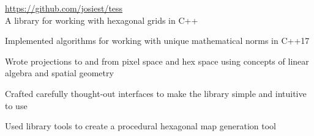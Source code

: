 \documentclass[10pt]{article}
\newenvironment{itemize*}
{\begin{itemize}[leftmargin=*]
    \setlength{\parskip}{0.5pt}}
{\end{itemize}}
\begin{document}
\begin{description}[leftmargin=!,labelwidth=\widthof{\bfseries tess}]
\item[tess] \url{https://github.com/josiest/tess}\\
    A library for working with hexagonal grids in C++
\end{description}
\begin{itemize*}
\item Implemented algorithms for working with unique mathematical norms in C++17
\item Wrote projections to and from pixel space and hex space using concepts of
      linear algebra and spatial geometry
\item Crafted carefully thought-out interfaces to make the library simple and
      intuitive to use
\item Used library tools to create a procedural hexagonal map generation tool
\end{itemize*}
\end{document}
